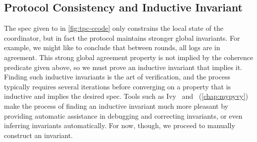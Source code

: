\subsection{Protocol Consistency and Inductive Invariant}
\label{sec:cons-induct-invar}

The spec given to  in \cref{fig:tpc-ccode}
only constrains the local state  of the coordinator, but
in fact the protocol maintains stronger global invariants.
%
For example, we might like to conclude that between rounds, all logs
are in agreement.
%
This strong global agreement property is not implied by the coherence
predicate given above, so we must prove an inductive invariant that
implies it.
%
Finding such inductive invariants is the art of verification, and the
process typically requires several iterations before converging on a
property that is inductive and implies the desired spec.
%
Tools such as Ivy~\cite{Padon-al:PLDI16} and \mypyvy~(\cref{chap:mypyvy}) make the process of finding
an inductive invariant much more pleasant by providing automatic
assistance in debugging and correcting invariants, or even inferring invariants automatically.
%
For now, though, we proceed to manually construct an invariant.

